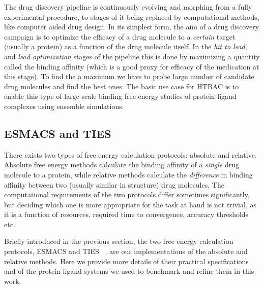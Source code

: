 
The drug discovery pipeline is continuously evolving and morphing from a fully 
experimental procedure, to stages of it being replaced by computational 
methods, like computer aided drug design. In its simplest form, the aim of a 
drug discovery campaign is to optimize the efficacy of a drug molecule to a 
\emph{certain} target (usually a protein) as a function of the drug molecule 
itself. In the \emph{hit to lead}, and \emph{lead optimization} stages of the 
pipeline this is done by maximizing a quantity called the binding affinity 
(which is a good proxy for efficacy of the medication at this stage). To find 
the a maximum we have to probe large number of candidate drug molecules and 
find the best ones. The basic use case for HTBAC is to enable this type of 
large scale binding free energy studies of protein-ligand complexes using 
ensemble simulations. 

\subsection{ESMACS and TIES}


There exists two types of free energy calculation protocols: absolute and 
relative. Absolute free energy methods calculate the binding affinity of a 
\emph{single} drug molecule to a protein, while relative methods calculate the 
\emph{difference} in binding affinity between two (usually similar in 
structure) drug molecules. The computational requirements of the two protocols 
differ sometimes significantly, but deciding which one is more appropriate for 
the task at hand is not trivial, as it is a function of resources, required 
time to convergence, accuracy thresholds etc.

Briefly introduced in the previous section, the two free energy calculation 
protocols, ESMACS and TIES ~\cite{Wan2017brd4, Bhati2017}, are our 
implementations of the absolute and relative methods. Here we provide more 
details of their practical specifications and of the protein ligand systems we 
used to benchmark and refine them in this work.


